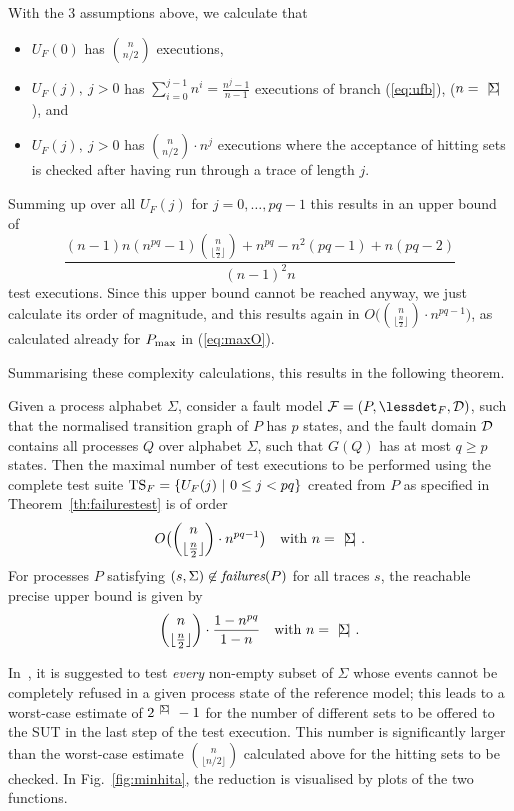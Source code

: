 With the 3 assumptions above, we calculate that
%
\begin{itemize}
\item  $U_F(0)$ has  $\binom{n}{n/2}$ executions,
\item $U_F(j),\ j > 0$ has $\sum_{i=0}^{j-1} n^i = \frac{n^j - 1}{n-1}$ executions of branch (\ref{eq:ufb}), ($n = {~|\! \Sigma\!|~}$), and  
\item $U_F(j),\ j > 0$ has $\binom{n}{n/2}\cdot n^j$ executions where the acceptance of 
hitting sets is checked after having run through a trace of length $j$. 
\end{itemize}
%
Summing up over all $U_F(j)$ for $j=0,\dots,pq-1$ this results in an upper bound of
%
\begin{equation}
\frac{(n-1)n(n^{pq} - 1)\binom{n}{\lfloor\frac{n}{2}\rfloor} + n^{pq} - n^2(pq-1) + n(pq-2)}{(n-1)^2n}
\end{equation}
%
test executions. Since this upper bound cannot be reached anyway, 
we just calculate its order of magnitude, and this results again in $O\big(\binom{n}{\lfloor\frac{n}{2}\rfloor}  \cdot n^{pq-1}\big)$, as calculated already for $P_\text{max}$ in (\ref{eq:maxO}). 

Summarising these complexity calculations, this results in the following theorem.
%
\begin{theorem}
\label{th:maxexecs}
Given a process alphabet $\Sigma$, consider a fault model ${\cal F} = (P,\lessdet_F,{\cal D})$, such that
the normalised transition graph of $P$ has $p$ states, and the fault domain 
${\cal D}$ contains all processes $Q$ over alphabet $\Sigma$, such that $G(Q)$ has at most 
$q\ge p$ states. Then the maximal 
number of test executions to be performed   using the complete test 
suite ${\text{TS}}_F = \{ U_F(j)~|~0 \le j < pq  \}$ created from $P$ as specified in Theorem~\ref{th:failurestest} is of order
%
\begin{equation*} 
O\big(\binom{n}{\lfloor\frac{n}{2}\rfloor}\cdot n^{pq-1}\big)\quad\text{with $n={~|\! \Sigma\!|~}$}.
\end{equation*} 
For processes $P$ satisfying $(s,\Sigma)\not\in\text{\it failures}(P)$ for all traces $s$, the reachable
precise  upper bound is given by
%
\begin{equation*}\label{eq:pmaxcomplexity} 
\binom{n}{\lfloor\frac{n}{2}\rfloor}\cdot\frac{1-n^{pq}}{1-n}\quad\text{with $n={~|\! \Sigma\!|~}$}.
\end{equation*}
\xbox
\end{theorem}
%


%
In~\cite{Hennessy:1988:ATP:50497}, it is suggested to test {\it every}
non-empty subset of $\Sigma$ whose events cannot be completely refused in a
given process state of the reference model; this leads to a worst-case
estimate of $2^{{~|\! \Sigma\!|~}}-1$ for the number of different sets to be
offered to the SUT in the last step of the test execution. This number is significantly larger than the worst-case estimate $\binom{n}{\lfloor n/2\rfloor}$ calculated above for the 
hitting sets to be checked.
In Fig.~\ref{fig:minhita}, the reduction is visualised by plots of
the two functions. 



